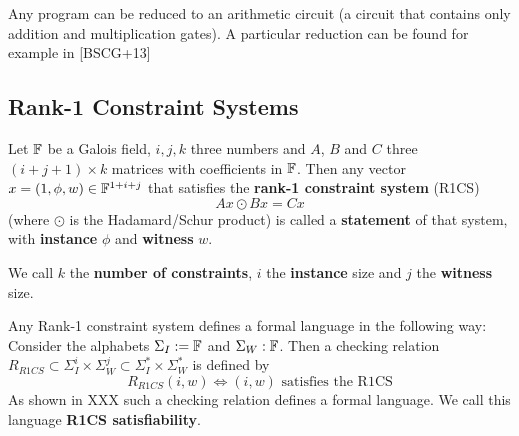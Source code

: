 \begin{example}

\end{example}

\begin{example}

\end{example}

Any program  can be reduced to  an arithmetic circuit  (a circuit that contains only addition and multiplication gates). A particular reduction can be found for example in [BSCG+13]

\subsection{Rank-1 Constraint Systems}

\begin{definition}
Let $\mathbb{F}$ be a Galois field, $i,j,k$ three numbers and $A$, $B$ and $C$ three $(i+j+1) \times k$ matrices with coefficients in $\mathbb{F}$. Then any vector $x= (1,\phi,w)\in \mathbb{F}^{1+i+j}$ that satisfies the \textbf{rank-1 constraint system} (R1CS)
$$
Ax \odot Bx = Cx
$$
(where $\odot$ is the Hadamard/Schur product) is called a \textbf{statement} of that system, with \textbf{instance} $\phi$ and \textbf{witness} $w$.

We call $k$ the \textbf{number of constraints}, $i$ the \textbf{instance} size and $j$ the \textbf{witness} size.
\end{definition}

\begin{remark} Any Rank-1 constraint system defines a formal language in the following way: Consider the alphabets $\Sigma_I:= \mathbb{F}$ and $\Sigma_W:\mathbb{F}$. Then a checking relation $R_{R1CS} \subset \Sigma_I^i \times \Sigma_W^j \subset \Sigma_I^* \times \Sigma_W^*$ is defined by 
$$
R_{R1CS}(i,w) \Leftrightarrow (i,w)\text{ satisfies the R1CS}
$$
As shown in XXX such a checking relation defines a formal language. We call this language \textbf{R1CS satisfiability}.
\end{remark}

